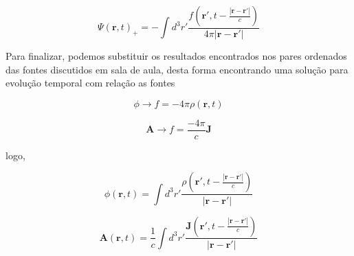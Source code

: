 \begin{equation}
	\Psi (\textbf{r}, t)_{+} = 
	-\int d^3 r'\frac{f(\textbf{r}', t -\frac{|\textbf{r}-\textbf{r}'|}{c})}{4\pi|\textbf{r}-\textbf{r}'|}
\end{equation}

Para finalizar, podemos substituir os resultados encontrados nos pares ordenados das fontes discutidos em sala de aula, desta forma encontrando uma solução para evolução temporal com relação as fontes

\begin{equation*}
	\phi \rightarrow f = -4\pi\rho(\textbf{r},t)
\end{equation*}

\begin{equation*}
	\textbf{A} \rightarrow f = \frac{-4\pi}{c}\textbf{J}
\end{equation*}

logo,

\begin{equation}
	\phi (\textbf{r}, t) = 
	\int d^3 r'\frac{\rho(\textbf{r}', t -\frac{|\textbf{r}-\textbf{r}'|}{c})}{|\textbf{r}-\textbf{r}'|}
\end{equation}

\begin{equation}
	\textbf{A} (\textbf{r}, t) = 
	\frac{1}{c}\int d^3 r'\frac{\textbf{J}(\textbf{r}', t -\frac{|\textbf{r}-\textbf{r}'|}{c})}{|\textbf{r}-\textbf{r}'|}
\end{equation}




